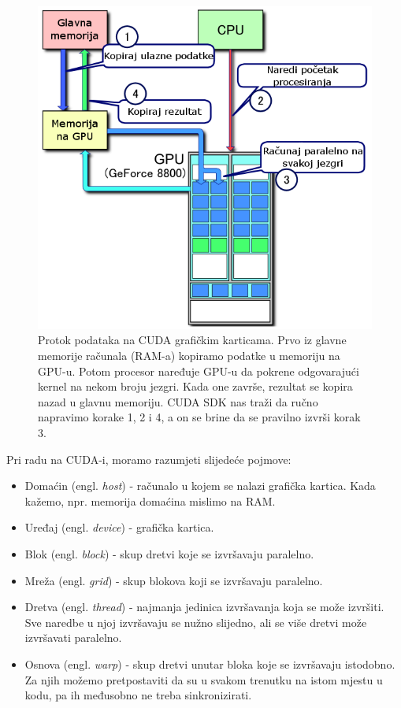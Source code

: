 \documentclass[times, utf8, zavrsni]{fer}
\begin{document}
\begin{figure}
\centering
\includegraphics[scale=0.7]{res/CUDA_processing_flow_(hr).PNG}
\caption[Protok podataka na CUDA grafičkim karticama]{Protok podataka
na CUDA grafičkim karticama. Prvo iz glavne memorije računala (RAM-a)
kopiramo podatke u memoriju na GPU-u. Potom procesor naređuje
GPU-u da pokrene odgovarajući kernel na nekom broju jezgri. 
Kada one završe, rezultat se kopira nazad u glavnu memoriju.
CUDA SDK nas traži da ručno napravimo korake 1, 2 i 4, a on
se brine da se pravilno izvrši korak 3.}
\label{figure:cuda:dataflow}
\end{figure}


Pri radu na CUDA-i, moramo razumjeti slijedeće pojmove:
\begin{itemize}
\item
Domaćin (engl. \textit{host}) - računalo u kojem se nalazi grafička kartica.
Kada kažemo, npr. memorija domaćina mislimo na RAM. 

\item
Uređaj (engl. \textit{device}) - grafička kartica.

\item
Blok (engl. \textit{block}) - skup dretvi koje se izvršavaju
paralelno. 

\item
Mreža (engl. \textit{grid}) - skup blokova koji se izvršavaju paralelno.

\item
Dretva (engl. \textit{thread}) - najmanja jedinica izvršavanja koja se
može izvršiti. Sve naredbe u njoj izvršavaju se nužno slijedno, ali
se više dretvi može izvršavati paralelno.

\item
Osnova (engl. \textit{warp}) - skup dretvi unutar bloka koje
se izvršavaju istodobno. Za njih možemo pretpostaviti
da su u svakom trenutku na istom mjestu u kodu, pa ih 
međusobno ne treba sinkronizirati. 

\end{itemize}
\end{document}
